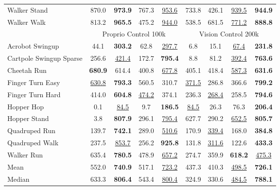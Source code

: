 \begin{table*}[ht]
\begin{center}
\begin{small}
{\begin{tabular}{l|cccc|cccc}
Walker Stand      &   870.0 &  \textbf{973.9} &  767.3 &  \underline{953.6} &  733.8 &   426.1 & \underline{939.5} & \textbf{944.9}  \\
Walker Walk           &    813.2 &   \textbf{965.5} &   475.2 &   \underline{944.0} &   538.5 &   681.5 &  \underline{771.2} & \textbf{888.8}  \\
\midrule
\multicolumn{1}{l|}{} & \multicolumn{4}{c|}{\large Proprio Control 100k} & \multicolumn{4}{c}{\large Vision Control 200k} \\
\midrule
Acrobot Swingup               &    44.1 &   \textbf{303.2}&    62.8 &   \underline{297.7} &    6.8 &    15.1 &   \underline{67.4} & \textbf{231.8} \\
Cartpole Swingup Sparse         &     256.6 &    \underline{421.4} &     172.7 &   \textbf{795.4} &    8.8 &    81.2 &   \underline{392.4} & \textbf{763.6} \\
Cheetah Run          &   \textbf{680.9} &  614.4 &   400.8 &  \underline{677.8} &  405.1 &  418.4 & \underline{587.3} & \textbf{631.6}  \\
Finger Turn Easy           &    \underline{630.8} &   \textbf{793.3} &   560.5 &  310.7 & \underline{371.5} &    286.8 &   366.6 & \textbf{799.2}  \\
Finger Turn Hard      &  414.0 &  \textbf{604.8} &  \underline{474.2} & 374.1 &  236.3 &  \underline{268.4} & 258.5 & \textbf{794.6} \\
Hopper Hop        &    0.1 &   \underline{84.5} &    9.7 &   \textbf{186.5} &    \underline{84.5}&   26.3&   76.3 & \textbf{206.4} \\
Hopper Stand             &      3.8 &     \textbf{807.9} &     296.1 &    \underline{795.4} &     627.7 &      290.2 &    \underline{652.5} & \textbf{805.7} \\
Quadruped Run              &    139.7 &   \textbf{742.1} &   289.0  &   \underline{510.6} &    170.9 &    \underline{339.4} &   168.0 & \textbf{384.8}  \\
Quadruped Walk               &   237.5 & \underline{853.7} &   256.2 &  \textbf{925.8} &   131.8 &   \underline{311.6} &  122.6 & \textbf{433.3} \\
Walker Run              &   635.4 &   \textbf{780.5} &   478.9 &  \underline{657.2} &   274.7 &   359.9 &  \textbf{618.2} & \underline{475.3}\\
\midrule
\multicolumn{1}{l|}{Mean}         &    552.0 &    \textbf{740.9} &    517.1 &    \underline{723.2} &   437.3 &    410.3 &   \underline{498.5} & \textbf{726.1}  \\
\multicolumn{1}{l|}{Median}        &    633.3 &    \textbf{806.4} &    543.4 &    \underline{800.4} &   324.9 &    330.6 &  \underline{484.5} & \textbf{788.1}    \\

\bottomrule
\end{tabular}
}
\end{small}
\end{center}
\end{table*}

